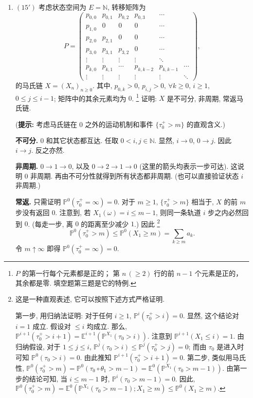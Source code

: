 \begin{enumerate}
    \item[四、]$(15')$ 考虑状态空间为 $E=\mathbb N$, 转移矩阵为
    \[
    P=
    \begin{pmatrix}
        p_{0,0}&p_{0,1}&p_{0,2}&p_{0,3}&\cdots\\
        p_{1,0}&0&0&0&\cdots\\
        p_{2,0}&p_{2,1}&0&0&\cdots\\
        p_{3,0}&p_{3,1}&p_{3,2}&0&\cdots\\
        \vdots&\vdots&\vdots&\vdots&\ddots\\
        p_{k,0}&p_{k,1}&\cdots&p_{k,k-2}&p_{k,k-1}&\cdots\\
        \vdots&\vdots&\vdots&\vdots&\vdots&\ddots
    \end{pmatrix},
    \]
    的马氏链 $X=(X_n)_{n\geq 0}$. 其中, $p_{0,k}>0$, $p_{i,j}>0$,
    $\forall k\geq 0$, $i\geq 1$, $0\leq j\leq i-1$; 矩阵中的其余元素均为 $0$.
    \footnote{$P$ 的第一行每个元素都是正的；
    第 $n\,(\geq 2)$ 行的前 $n-1$ 个元素是正的，其余都是零. 填空题第三题是它的特例.}
    证明: $X$ 是不可分, 非周期, 常返马氏链.

    (\textbf{提示:} 考虑马氏链在 $0$ 之外的运动机制和事件 $\{\tau_0^+>m\}$ 的直观含义.)

    \begin{proofc}[证明]
        \textbf{不可分.} $0$ 和其它状态都互达. 任取 $0<i,j\in\mathbb N$. 
        显然, $i\to 0$, $0\to j$. 因此 $i\to j$. 反之亦然.

        \textbf{非周期.} $0\to 1\to 0$, 以及 $0\to 2\to 1\to 0$ (这里的箭头均表示一步可达).
        这说明 $0$ 非周期. 再由不可分性就得到所有状态都非周期. (也可以直接验证状态 $i$ 非周期.)

        \textbf{常返.} 只需证明 $\mathbb P^0(\tau_0^+=\infty)=0$. 
        对于 $m\geq 1$, $\{\tau_0^+>m\}$ 相当于, $X$ 的前 $m$ 步没有返回 $0$. 
        注意到, 若 $X_1(\omega)=i\leq m-1$, 则同一条轨道 $i$ 步之内必然回到 $0$. 
        (每走一步, 离 $0$ 的距离至少减少 $1$.) 因此
        \footnote{这是一种直观表述, 它可以按照下述方式严格证明.
        
        第一步, 用归纳法证明: 对于任何 $i\geq 1$, $\mathbb P^i(\tau_0^+>i)=0$. 
        显然, 这个结论对 $i=1$ 成立. 假设对 $\leq i$ 均成立. 那么,
        $\mathbb P^{i+1}(\tau_0^+>i+1)=
        \mathbb E^{i+1}(\mathbb P^{X_1}(\tau_0>i))$.
        注意到 $\mathbb P^{i+1}(X_1\leq i)=1$. 由归纳假设, 对于 $1\leq j\leq i$,
        $\mathbb P^j(\tau_0>i)\leq \mathbb P^j(\tau_0^+>j)=0$; 而由 $\tau_0$ 是进入时可知
        $\mathbb P^0(\tau_0>i)=0$. 由此推知 $\mathbb P^{i+1}(\tau_0^+>i+1)=0$.
        第二步, 类似用马氏性,
        $\mathbb P^0(\tau_0^+>m)=\mathbb P^0(\tau_0\circ\theta_1>m-1)
        =\mathbb E^0(\mathbb P^{X_1}(\tau_0>m-1))$.
        由第一步的结论可知, 当 $i\leq m-1$ 时, $\mathbb P^i(\tau_0>m-1)=0$. 因此,
        $\mathbb P^0(\tau_0^+>m)=
        \mathbb E^0(\mathbb P^{X_1}(\tau_0>m-1);X_1\geq m)
        \leq \mathbb P^0(X_1\geq m)$.}
        \[
            \mathbb P^0(\tau_0^+>m)\leq \mathbb P^0(X_1\geq m)=\sum_{k\geq m}a_k.
        \]
        令 $m\uparrow\infty$ 即得 $\mathbb P^0(\tau_0^+=\infty)=0$.


\end{proofc}
\end{enumerate}
